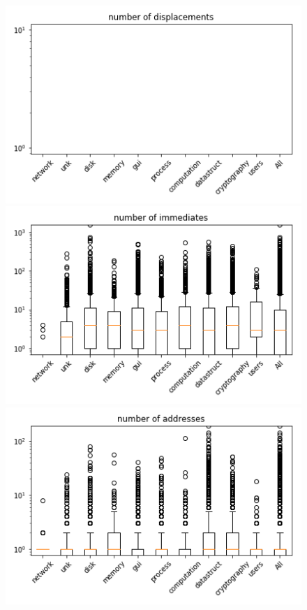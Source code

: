 \begin{appendices}
\begin{figure}[H]
%
\centering
\includegraphics[width=0.9\linewidth]{img/boxplots/v1_unbalanced_number_of_displacements.png}
\endminipage
{}%
\centering
\includegraphics[width=0.9\linewidth]{img/boxplots/v1_unbalanced_number_of_immediates.png}
\endminipage
{}%
\centering
\includegraphics[width=0.9\linewidth]{img/boxplots/v1_unbalanced_number_of_addresses.png}
\endminipage


\end{figure}
\end{appendices}
